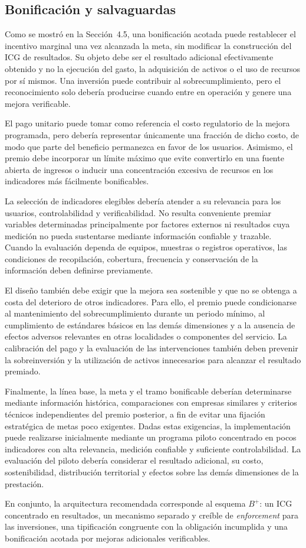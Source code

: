 \subsection{Bonificación y salvaguardas}

Como se mostró en la Sección~4.5, una bonificación acotada puede restablecer el incentivo marginal una vez alcanzada la meta, sin modificar la construcción del ICG de resultados. Su objeto debe ser el resultado adicional efectivamente obtenido y no la ejecución del gasto, la adquisición de activos o el uso de recursos por sí mismos. Una inversión puede contribuir al sobrecumplimiento, pero el reconocimiento solo debería producirse cuando entre en operación y genere una mejora verificable.

El pago unitario puede tomar como referencia el costo regulatorio de la mejora programada, pero debería representar únicamente una fracción de dicho costo, de modo que parte del beneficio permanezca en favor de los usuarios. Asimismo, el premio debe incorporar un límite máximo que evite convertirlo en una fuente abierta de ingresos o inducir una concentración excesiva de recursos en los indicadores más fácilmente bonificables.

La selección de indicadores elegibles debería atender a su relevancia para los usuarios, controlabilidad y verificabilidad. No resulta conveniente premiar variables determinadas principalmente por factores externos ni resultados cuya medición no pueda sustentarse mediante información confiable y trazable. Cuando la evaluación dependa de equipos, muestras o registros operativos, las condiciones de recopilación, cobertura, frecuencia y conservación de la información deben definirse previamente.

El diseño también debe exigir que la mejora sea sostenible y que no se obtenga a costa del deterioro de otros indicadores. Para ello, el premio puede condicionarse al mantenimiento del sobrecumplimiento durante un periodo mínimo, al cumplimiento de estándares básicos en las demás dimensiones y a la ausencia de efectos adversos relevantes en otras localidades o componentes del servicio. La calibración del pago y la evaluación de las intervenciones también deben prevenir la sobreinversión y la utilización de activos innecesarios para alcanzar el resultado premiado.

Finalmente, la línea base, la meta y el tramo bonificable deberían determinarse mediante información histórica, comparaciones con empresas similares y criterios técnicos independientes del premio posterior, a fin de evitar una fijación estratégica de metas poco exigentes. Dadas estas exigencias, la implementación puede realizarse inicialmente mediante un programa piloto concentrado en pocos indicadores con alta relevancia, medición confiable y suficiente controlabilidad. La evaluación del piloto debería considerar el resultado adicional, su costo, sostenibilidad, distribución territorial y efectos sobre las demás dimensiones de la prestación.

En conjunto, la arquitectura recomendada corresponde al esquema \(B^{+}\): un ICG concentrado en resultados, un mecanismo separado y creíble de \textit{enforcement} para las inversiones, una tipificación congruente con la obligación incumplida y una bonificación acotada por mejoras adicionales verificables.
